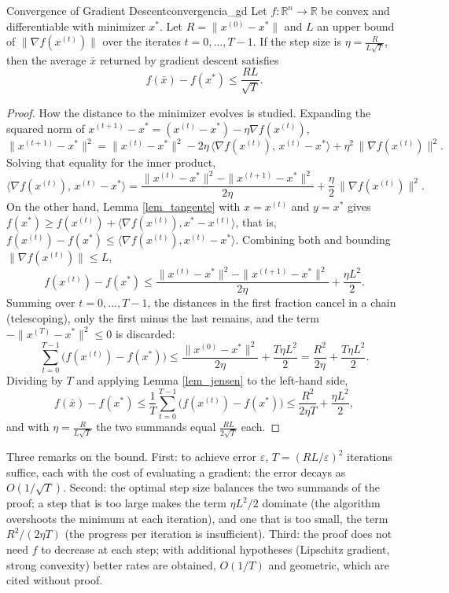 \documentclass[11pt, a4paper]{article}
\begin{document}
\begin{teorema}{Convergence of Gradient Descent}{convergencia_gd}
Let $f: \mathbb{R}^n \to \mathbb{R}$ be convex and differentiable with minimizer $x^*$. Let $R = \|x^{(0)} - x^*\|$ and $L$ an upper bound of $\|\nabla f(x^{(t)})\|$ over the iterates $t = 0, \dots, T-1$. If the step size is $\eta = \frac{R}{L \sqrt{T}}$, then the average $\bar{x}$ returned by gradient descent satisfies
\[
f(\bar{x}) - f(x^*) \le \frac{R L}{\sqrt{T}}.
\]
\end{teorema}

\begin{proof}
How the distance to the minimizer evolves is studied. Expanding the squared norm of $x^{(t+1)} - x^* = (x^{(t)} - x^*) - \eta \nabla f(x^{(t)})$,
\[
\|x^{(t+1)} - x^*\|^2 = \|x^{(t)} - x^*\|^2 - 2 \eta \, \langle \nabla f(x^{(t)}), \, x^{(t)} - x^* \rangle + \eta^2 \, \|\nabla f(x^{(t)})\|^2.
\]
Solving that equality for the inner product,
\[
\langle \nabla f(x^{(t)}), \, x^{(t)} - x^* \rangle
= \frac{\|x^{(t)} - x^*\|^2 - \|x^{(t+1)} - x^*\|^2}{2 \eta} + \frac{\eta}{2} \, \|\nabla f(x^{(t)})\|^2.
\]
On the other hand, Lemma \ref{lem_tangente} with $x = x^{(t)}$ and $y = x^*$ gives $f(x^*) \ge f(x^{(t)}) + \langle \nabla f(x^{(t)}), x^* - x^{(t)} \rangle$, that is, $f(x^{(t)}) - f(x^*) \le \langle \nabla f(x^{(t)}), x^{(t)} - x^* \rangle$. Combining both and bounding $\|\nabla f(x^{(t)})\| \le L$,
\[
f(x^{(t)}) - f(x^*) \le \frac{\|x^{(t)} - x^*\|^2 - \|x^{(t+1)} - x^*\|^2}{2 \eta} + \frac{\eta L^2}{2}.
\]
Summing over $t = 0, \dots, T-1$, the distances in the first fraction cancel in a chain (telescoping), only the first minus the last remains, and the term $-\|x^{(T)} - x^*\|^2 \le 0$ is discarded:
\[
\sum_{t=0}^{T-1} \big( f(x^{(t)}) - f(x^*) \big) \le \frac{\|x^{(0)} - x^*\|^2}{2 \eta} + \frac{T \eta L^2}{2} = \frac{R^2}{2 \eta} + \frac{T \eta L^2}{2}.
\]
Dividing by $T$ and applying Lemma \ref{lem_jensen} to the left-hand side,
\[
f(\bar{x}) - f(x^*) \le \frac{1}{T} \sum_{t=0}^{T-1} \big( f(x^{(t)}) - f(x^*) \big) \le \frac{R^2}{2 \eta T} + \frac{\eta L^2}{2},
\]
and with $\eta = \frac{R}{L \sqrt{T}}$ the two summands equal $\frac{RL}{2\sqrt{T}}$ each.
\end{proof}

\obs Three remarks on the bound. First: to achieve error $\varepsilon$, $T = (RL/\varepsilon)^2$ iterations suffice, each with the cost of evaluating a gradient: the error decays as $O(1/\sqrt{T})$. Second: the optimal step size balances the two summands of the proof; a step that is too large makes the term $\eta L^2 / 2$ dominate (the algorithm overshoots the minimum at each iteration), and one that is too small, the term $R^2 / (2\eta T)$ (the progress per iteration is insufficient). Third: the proof does not need $f$ to decrease at each step; with additional hypotheses (Lipschitz gradient, strong convexity) better rates are obtained, $O(1/T)$ and geometric, which are cited without proof.
\end{document}

